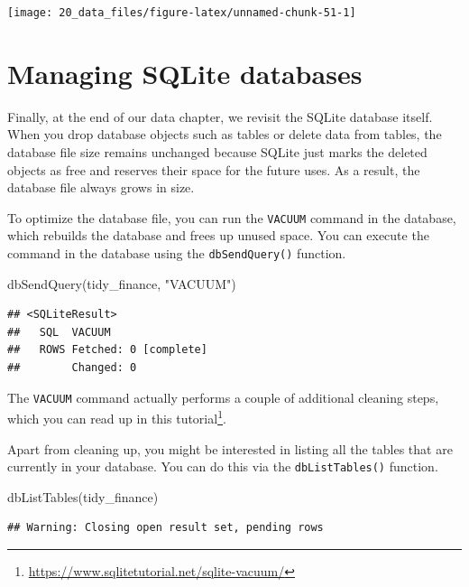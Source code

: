 \documentclass[
]{krantz}
\newenvironment{Shaded}{\begin{snugshade}}{\end{snugshade}}
\newcommand{\FunctionTok}[1]{\textcolor[rgb]{0,0,0}{#1}}
\newcommand{\NormalTok}[1]{#1}
\newcommand{\StringTok}[1]{\textcolor[rgb]{0.5,0.5,0.5}{#1}}
\renewcommand{\href}[2]{#2\footnote{\url{#1}}}
\begin{document}
\begin{center}\texttt{[image: 20\_data\_files/figure-latex/unnamed-chunk-51-1]} \end{center}

\hypertarget{managing-sqlite-databases}{%
\section{Managing SQLite databases}\label{managing-sqlite-databases}}

Finally, at the end of our data chapter, we revisit the SQLite database itself. When you drop database objects such as tables or delete data from tables, the database file size remains unchanged because SQLite just marks the deleted objects as free and reserves their space for the future uses. As a result, the database file always grows in size.

To optimize the database file, you can run the \texttt{VACUUM} command in the database, which rebuilds the database and frees up unused space. You can execute the command in the database using the \texttt{dbSendQuery()} function.

\begin{Shaded}
\begin{Highlighting}[]
\FunctionTok{dbSendQuery}\NormalTok{(tidy\_finance, }\StringTok{"VACUUM"}\NormalTok{)}
\end{Highlighting}
\end{Shaded}

\begin{verbatim}
## <SQLiteResult>
##   SQL  VACUUM
##   ROWS Fetched: 0 [complete]
##        Changed: 0
\end{verbatim}

The \texttt{VACUUM} command actually performs a couple of additional cleaning steps, which you can read up in \href{https://www.sqlitetutorial.net/sqlite-vacuum/}{this tutorial}.

Apart from cleaning up, you might be interested in listing all the tables that are currently in your database. You can do this via the \texttt{dbListTables()} function.

\begin{Shaded}
\begin{Highlighting}[]
\FunctionTok{dbListTables}\NormalTok{(tidy\_finance)}
\end{Highlighting}
\end{Shaded}

\begin{verbatim}
## Warning: Closing open result set, pending rows
\end{verbatim}
\end{document}
